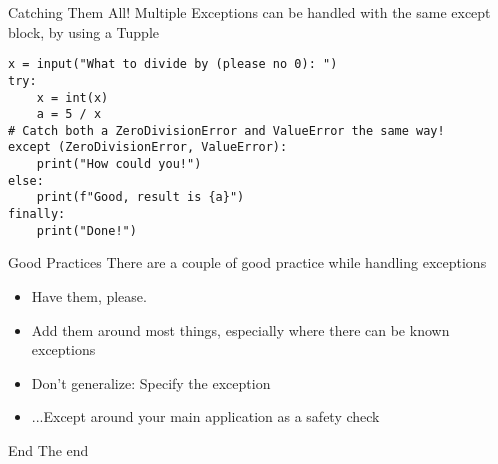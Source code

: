 \begin{frame}[containsverbatim]{Catching Them All!}
    Multiple Exceptions can be handled with the same except block, by using a Tupple

    \begin{verbatim}
x = input("What to divide by (please no 0): ")
try:
    x = int(x)
    a = 5 / x
# Catch both a ZeroDivisionError and ValueError the same way!
except (ZeroDivisionError, ValueError):
    print("How could you!")
else:
    print(f"Good, result is {a}")
finally:
    print("Done!")
    \end{verbatim}
\end{frame}

\begin{frame}{Good Practices}
    There are a couple of good practice while handling exceptions
    \begin{itemize}
        \item Have them, please.
        \item Add them around most things, especially where there can be known exceptions
        \item Don't generalize: Specify the exception
        \item ...Except around your main application as a safety check
    \end{itemize}
\end{frame}

\begin{frame}[standout]{End}
  The end
\end{frame}


